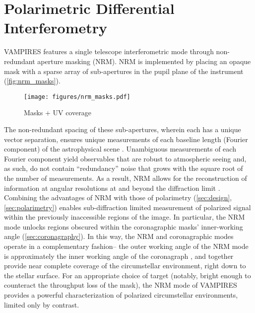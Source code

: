 \section{Polarimetric Differential Interferometry}\label{sec:interferometry}


 
 

VAMPIRES features a single telescope interferometric mode through non-redundant aperture masking (NRM). NRM is implemented by placing an opaque mask with a sparse array of sub-apertures in the pupil plane of the instrument (\autoref{fig:nrm_masks}).


\begin{figure*}[t]
    \centering
    \texttt{[image: figures/nrm\_masks.pdf]}
    \caption{Masks + UV coverage\label{fig:nrm_masks}}
\end{figure*}

The non-redundant spacing of these sub-apertures, wherein each has a unique vector separation, ensures unique measurements of each baseline length (Fourier component) of the astrophysical scene \citep{tuthill_aperture_2000}. Unambiguous measurements of each Fourier component yield observables that are robust to atmospheric seeing and, as such, do not contain ``redundancy'' noise that grows with the square root of the number of measurements. As a result, NRM allows for the reconstruction of information at angular resolutions at and beyond the diffraction limit \citep{labeyrie_introduction_2014}. Combining the advantages of NRM with those of polarimetry (\autoref{sec:design}, \autoref{sec:polarimetry}) enables sub-diffraction limited measurement of polarized signal within the previously inaccessible regions of the image. In particular, the NRM mode unlocks regions obscured within the coronagraphic masks' inner-working angle (\autoref{sec:coronagraphy}). In this way, the NRM and coronagraphic modes operate in a complementary fashion-- the outer working angle of the NRM mode is approximately the inner working angle of the coronagraph \citep{norris_vampires_2015}, and together provide near complete coverage of the circumstellar environment, right down to the stellar surface. For an appropriate choice of target (notably, bright enough to counteract the throughput loss of the mask), the NRM mode of VAMPIRES provides a powerful characterization of polarized circumstellar environments, limited only by contrast. 


